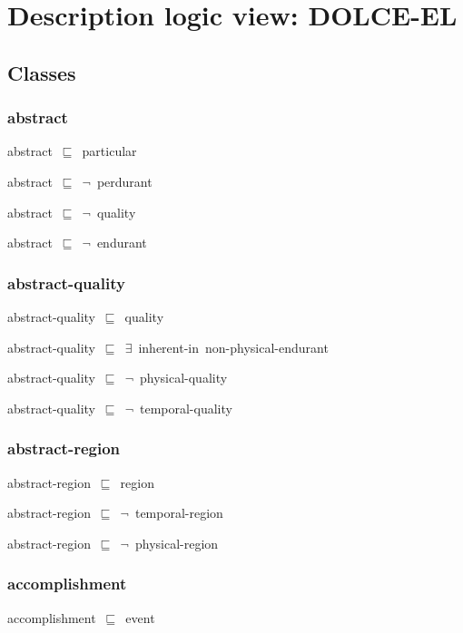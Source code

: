 \documentclass{article}
\begin{document}
\section*{Description logic view: DOLCE-EL}
\subsection*{Classes}

\subsubsection*{abstract}

abstract~\ensuremath{\sqsubseteq}~particular~

abstract~\ensuremath{\sqsubseteq}~\ensuremath{\lnot}~perdurant

abstract~\ensuremath{\sqsubseteq}~\ensuremath{\lnot}~quality

abstract~\ensuremath{\sqsubseteq}~\ensuremath{\lnot}~endurant

\subsubsection*{abstract-quality}

abstract-quality~\ensuremath{\sqsubseteq}~quality~

abstract-quality~\ensuremath{\sqsubseteq}~\ensuremath{\exists}~inherent-in~non-physical-endurant~

abstract-quality~\ensuremath{\sqsubseteq}~\ensuremath{\lnot}~physical-quality

abstract-quality~\ensuremath{\sqsubseteq}~\ensuremath{\lnot}~temporal-quality

\subsubsection*{abstract-region}

abstract-region~\ensuremath{\sqsubseteq}~region~

abstract-region~\ensuremath{\sqsubseteq}~\ensuremath{\lnot}~temporal-region

abstract-region~\ensuremath{\sqsubseteq}~\ensuremath{\lnot}~physical-region

\subsubsection*{accomplishment}

accomplishment~\ensuremath{\sqsubseteq}~event~
\end{document}
